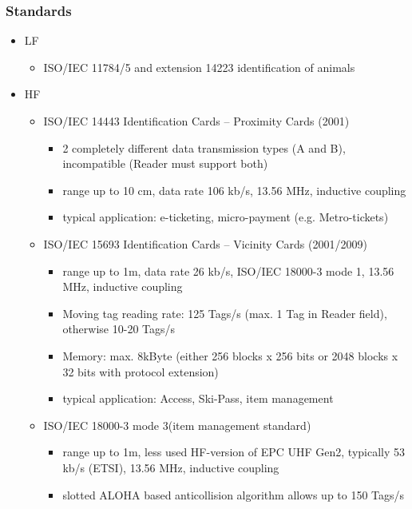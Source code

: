 \subsubsection{Standards}
	\begin{itemize}
		\item LF
			\begin{itemize}
				\item ISO/IEC 11784/5 and extension 14223 identification of animals
			\end{itemize} 
		\item HF
			\begin{itemize}
				\item ISO/IEC 14443	Identification Cards – Proximity Cards (2001) 
					\begin{itemize}
						\item 2 completely different data transmission types (A and B), incompatible (Reader must support both)
						\item range up to 10 cm, data rate 106 kb/s, 13.56 MHz, inductive coupling
						\item typical application: e-ticketing, micro-payment (e.g. Metro-tickets)
					\end{itemize}
				\item ISO/IEC 15693	Identification Cards – Vicinity Cards (2001/2009)
					\begin{itemize}
						\item range up to 1m, data rate 26 kb/s, ISO/IEC 18000-3 mode 1, 13.56 MHz, inductive coupling
						\item Moving tag reading rate: 125 Tags/s (max. 1 Tag in Reader field), otherwise 10-20 Tags/s
						\item Memory: max. 8kByte (either 256 blocks x 256 bits or 2048 blocks x 32 bits with protocol extension)
						\item typical application: Access, Ski-Pass, item management
					\end{itemize}
				\item ISO/IEC 18000-3 mode 3(item management standard)
					\begin{itemize}
						\item range up to 1m, less used HF-version of EPC UHF Gen2, typically 53 kb/s (ETSI), 13.56 MHz, inductive coupling
						\item slotted ALOHA based anticollision algorithm allows up to 150 Tags/s
					\end{itemize}
						

\end{itemize}
\end{itemize}

